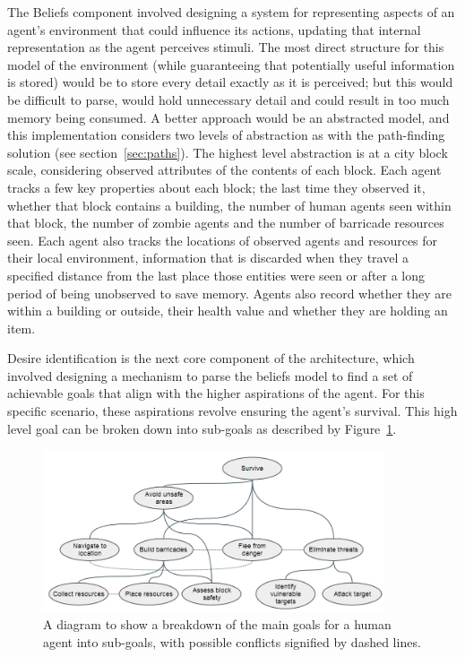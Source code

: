 \documentclass[a4paper,12pt]{article}
\begin{document}
The Beliefs component involved designing a system for representing aspects of an agent's environment that could influence its actions, updating that internal representation as the agent perceives stimuli. The most direct structure for this model of the environment (while guaranteeing that potentially useful information is stored) would be to store every detail exactly as it is perceived; but this would be difficult to parse, would hold unnecessary detail and could result in too much memory being consumed. A better approach would be an abstracted model, and this implementation considers two levels of abstraction as with the path-finding solution (see section~\ref{sec:paths}). The highest level abstraction is at a city block scale, considering observed attributes of the contents of each block. Each agent tracks a few key properties about each block; the last time they observed it, whether that block contains a building, the number of human agents seen within that block, the number of zombie agents and the number of barricade resources seen. Each agent also tracks the locations of observed agents and resources for their local environment, information that is discarded when they travel a specified distance from the last place those entities were seen or after a long period of being unobserved to save memory. Agents also record whether they are within a building or outside, their health value and whether they are holding an item.

Desire identification is the next core component of the architecture, which involved designing a mechanism to parse the beliefs model to find a set of achievable goals that align with the higher aspirations of the agent. For this specific scenario, these aspirations revolve ensuring the agent's survival. This high level goal can be broken down into sub-goals as described by Figure~\ref{fig:goals}.

\label{sec:bdi}
\begin{figure}[h]
\centering
\includegraphics[width=0.9\textwidth]{goals}
\caption{A diagram to show a breakdown of the main goals for a human agent into sub-goals, with possible conflicts signified by dashed lines.}
\label{fig:goals}
\end{figure}
\end{document}
